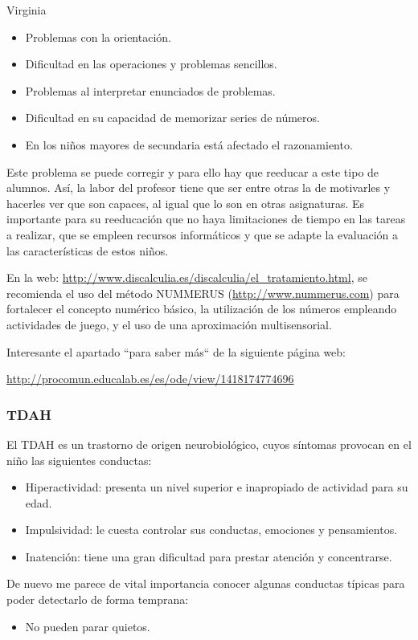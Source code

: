 \begin{opin}{\virgicolor}{Virginia}
\begin{itemize}
\item Problemas con la orientación. 

\item Dificultad en las operaciones y problemas sencillos.

\item Problemas al interpretar enunciados de problemas.

\item Dificultad en su capacidad de memorizar series de números.

\item En los niños mayores de secundaria está afectado el razonamiento.
\end{itemize}

Este problema se puede corregir y para ello hay que reeducar a este tipo de alumnos. Así, la labor del profesor tiene que ser entre otras la de motivarles y hacerles ver que son capaces, al igual que lo son en otras asignaturas.  Es importante para su reeducación que no haya limitaciones de tiempo en las tareas a realizar, que se empleen recursos informáticos y que se adapte la evaluación a las características de estos niños.

En la web: \url{http://www.discalculia.es/discalculia/el_tratamiento.html}, se recomienda el uso del método NUMMERUS (\url{http://www.nummerus.com}) para fortalecer el concepto numérico básico, la utilización de los números empleando actividades de juego, y el uso de una aproximación multisensorial.

Interesante el apartado “para saber más“ de la siguiente página web:

\url{http://procomun.educalab.es/es/ode/view/1418174774696}

\subsubsection{TDAH}

El TDAH es un trastorno de origen neurobiológico, cuyos síntomas provocan en el niño las siguientes conductas:

\begin{itemize}
\item Hiperactividad: presenta un nivel superior e inapropiado de actividad para su edad.

\item Impulsividad: le cuesta controlar sus conductas, emociones y pensamientos.

\item Inatención: tiene una gran dificultad para prestar atención y concentrarse.
\end{itemize}
De nuevo me parece de vital importancia conocer algunas conductas típicas para poder detectarlo de forma temprana:
\begin{itemize}
\item No pueden parar quietos.


\end{itemize}
\end{opin}
